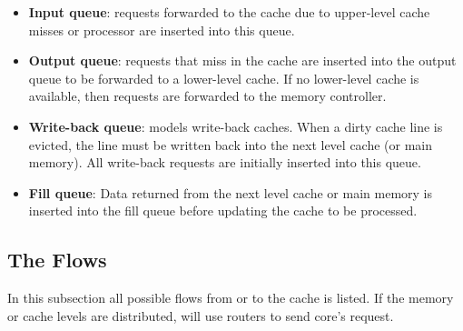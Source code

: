 \begin{itemize}
  \item \textbf{Input queue}: requests forwarded to the cache due to upper-level 
		cache misses or processor are inserted into this queue.

  \item \textbf{Output queue}: requests that miss in the cache are inserted into the
  output queue to be forwarded to a lower-level cache. If no lower-level cache
  is available, then requests are forwarded to the memory controller.

  \item \textbf{Write-back queue}: \SIM models write-back caches. When a dirty cache
  line is evicted, the line must be written back into the next level cache (or
  main memory). All write-back requests are initially inserted into this queue.

  \item \textbf{Fill queue}: Data returned from the next level cache or main memory 
  is inserted into the fill queue before updating the cache to be processed.

  
\end{itemize}

\subsection{The Flows}
\label{sec:cache-flow}
In this subsection all possible flows from or to the cache is listed. If the memory or cache
levels are distributed, \SIM will use routers to send core's request. 

